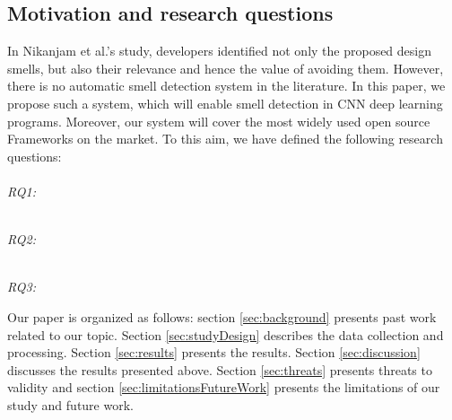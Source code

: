 \subsection{Motivation and research questions}
In Nikanjam et al.'s study, developers identified not only the proposed design smells, but also their relevance and hence the value of avoiding them. However, there is no automatic smell detection system in the literature. In this paper, we propose such a system, which will enable smell detection in CNN deep learning programs. Moreover, our system will cover the most widely used open source Frameworks on the market. To this aim, we have defined the following research questions:\\

\emph{\\RQ1:\RQOne} %

\emph{\\RQ2:\RQTwo} %

\emph{\\RQ3:\RQThree} %

Our paper is organized as follows: section \ref{sec:background} presents past work related to our topic. Section \ref{sec:studyDesign} describes the data collection and processing. Section \ref{sec:results} presents the results. Section \ref{sec:discussion} discusses the results presented above. Section \ref{sec:threats} presents threats to validity and section \ref{sec:limitationsFutureWork} presents the limitations of our study and future work.
